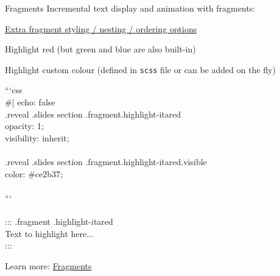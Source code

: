 \documentclass[
  10pt,
  ignorenonframetext,
  aspectratio=1610,
]{beamer}
\begin{document}
\begin{frame}[fragile]{Fragments}
\protect{}\label{fragments}
Incremental text display and animation with fragments:

\href{https://quarto.org/docs/presentations/revealjs/advanced.html\#fragment-classes}{Extra
fragment styling / nesting / ordering options}





\pause


{%

Highlight red (but green and blue are also built-in)

}%

\pause

{%

Highlight custom colour (defined in \texttt{scss} file or can be added
on the fly)

\begin{tcolorbox}[colback=lightgray!40, colframe=navbargrey, arc=2pt, boxrule=0.5pt, fontupper=\ttfamily\footnotesize]
```{css} \\ \#| echo: false \\ .reveal .slides section .fragment.highlight-itared { \\   opacity: 1; \\   visibility: inherit; \\ } \\ .reveal .slides section .fragment.highlight-itared.visible { \\   color: \#ce2b37; \\ } \\ ``` \\  \\ ::: {.fragment .highlight-itared} \\ Text to highlight here... \\ :::
\end{tcolorbox}

}%

Learn more:
\href{https://quarto.org/docs/presentations/revealjs/advanced.html\#fragments}{Fragments}
\end{frame}
\end{document}
